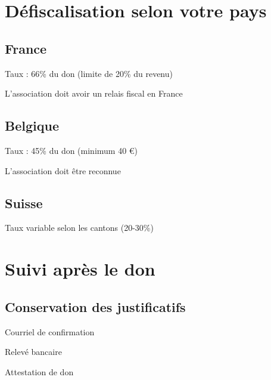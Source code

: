 \documentclass[12pt, a4paper]{article}
\begin{document}
\newpage

\section{Défiscalisation selon votre pays}

\subsection{France}
\begin{heartlist}
    \item Taux : 66\% du don (limite de 20\% du revenu)
    \item L'association doit avoir un relais fiscal en France
\end{heartlist}

\subsection{Belgique}
\begin{heartlist}
    \item Taux : 45\% du don (minimum 40 €)
    \item L'association doit être reconnue
\end{heartlist}

\subsection{Suisse}
\begin{heartlist}
    \item Taux variable selon les cantons (20-30\%)
\end{heartlist}

\newpage

\section{Suivi après le don}

\subsection{Conservation des justificatifs}
\begin{checklist}
    \item Courriel de confirmation
    \item Relevé bancaire
    \item Attestation de don
\end{checklist}
\end{document}
